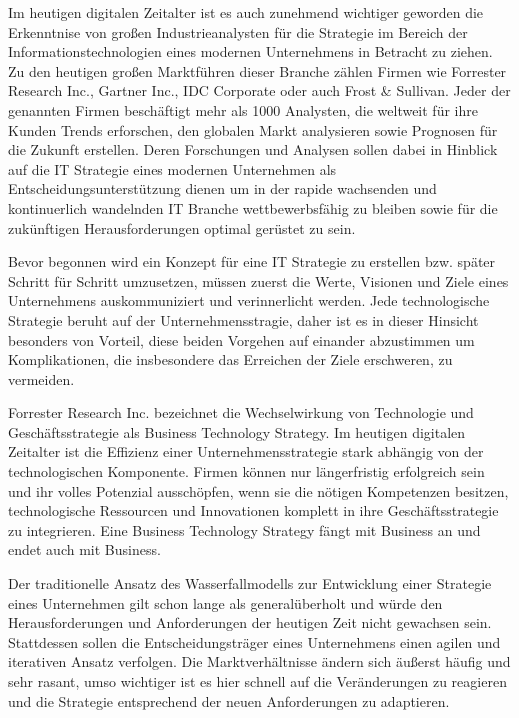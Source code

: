 Im heutigen digitalen Zeitalter ist es auch zunehmend wichtiger geworden die Erkenntnise von großen Industrieanalysten für die Strategie im Bereich der Informationstechnologien eines modernen Unternehmens in Betracht zu ziehen. Zu den heutigen großen Marktführen dieser Branche zählen Firmen wie Forrester Research Inc., Gartner Inc., IDC Corporate oder auch Frost \& Sullivan. Jeder der genannten Firmen beschäftigt mehr als 1000 Analysten, die weltweit für ihre Kunden Trends erforschen, den globalen Markt analysieren sowie Prognosen für die Zukunft erstellen. Deren Forschungen und Analysen sollen dabei in Hinblick auf die IT Strategie eines modernen Unternehmen als Entscheidungsunterstützung dienen um in der rapide wachsenden und kontinuerlich wandelnden IT Branche wettbewerbsfähig zu bleiben sowie für die zukünftigen Herausforderungen optimal gerüstet zu sein. 

Bevor begonnen wird ein Konzept für eine IT Strategie zu erstellen bzw. später Schritt für Schritt umzusetzen, müssen zuerst die Werte, Visionen und Ziele eines Unternehmens auskommuniziert und verinnerlicht werden. Jede technologische Strategie beruht auf der Unternehmensstragie, daher ist es in dieser Hinsicht besonders von Vorteil, diese beiden Vorgehen auf einander abzustimmen um Komplikationen, die insbesondere das Erreichen der Ziele erschweren, zu vermeiden.
 
Forrester Research Inc. bezeichnet die Wechselwirkung von Technologie und Geschäftsstrategie als Business Technology Strategy. Im heutigen digitalen Zeitalter ist die Effizienz einer Unternehmensstrategie stark abhängig von der technologischen Komponente. Firmen können nur längerfristig erfolgreich sein und ihr volles Potenzial ausschöpfen, wenn sie die nötigen Kompetenzen besitzen, technologische Ressourcen und Innovationen komplett in ihre Geschäftsstrategie zu integrieren. Eine Business Technology Strategy fängt mit Business an und endet auch mit Business. 

Der traditionelle Ansatz des Wasserfallmodells zur Entwicklung einer Strategie eines Unternehmen gilt schon lange als generalüberholt und würde den Herausforderungen und Anforderungen der heutigen Zeit nicht gewachsen sein. Stattdessen sollen die Entscheidungsträger eines Unternehmens einen agilen und iterativen Ansatz verfolgen. Die Marktverhältnisse ändern sich äußerst häufig und sehr rasant, umso wichtiger ist es hier schnell auf die Veränderungen zu reagieren und die Strategie entsprechend der neuen Anforderungen zu adaptieren\cite{ForresterResearch}. 